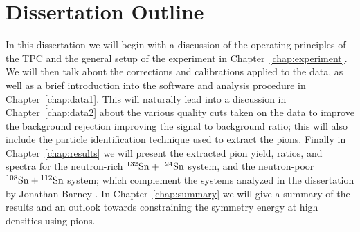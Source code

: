 \section{Dissertation Outline}
In this dissertation we will begin with a discussion of the operating principles of the \spirit TPC and the general setup of the experiment in Chapter~\ref{chap:experiment}. We will then talk about the corrections and calibrations applied to the data, as well as a brief introduction into the software and analysis procedure in Chapter~\ref{chap:data1}. This will naturally lead into a discussion in Chapter~\ref{chap:data2} about the various quality cuts taken on the data to improve the background rejection improving the signal to background ratio; this will also include the particle identification technique used to extract the pions. Finally in Chapter~\ref{chap:results} we will present the extracted pion yield, ratios, and spectra for the neutron-rich  ${}^{132}\mathrm{Sn} + {}^{124}\mathrm{Sn}$ system, and the neutron-poor ${}^{108}\mathrm{Sn} + {}^{112}\mathrm{Sn}$ system; which complement the systems analyzed in the dissertation by Jonathan Barney \cite{jon}. In Chapter~\ref{chap:summary} we will give a summary of the results and an outlook towards constraining the symmetry energy at high densities using pions. 